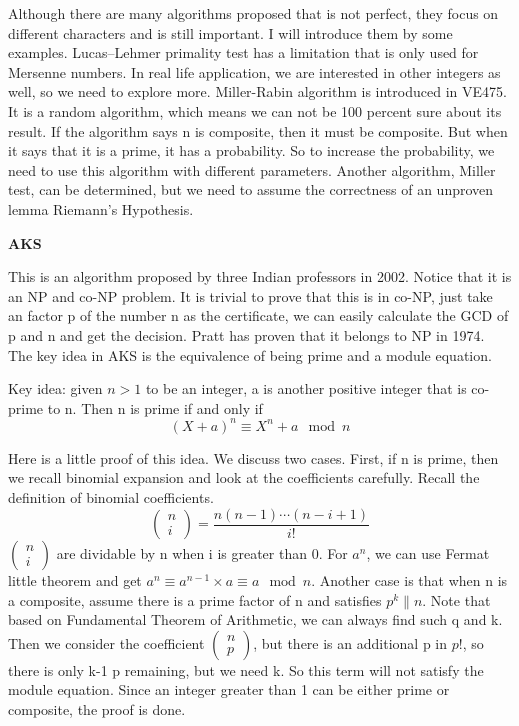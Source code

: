 \documentclass[catalog.tex]{subfiles}
\begin{document}
Although there are many algorithms proposed that is not perfect, they focus on different characters and is still important. I will introduce them by some examples. Lucas–Lehmer primality test has a limitation that is only used for Mersenne numbers\cite{bruce1993really}. In real life application, we are interested in other integers as well, so we need to explore more. Miller-Rabin algorithm is introduced in VE475. It is a random algorithm, which means we can not be 100 percent sure about its result. If the algorithm says n is composite, then it must be composite. But when it says that it is a prime, it has a probability. So to increase the probability, we need to use this algorithm with different parameters\cite{ve475}. Another algorithm, Miller test, can be determined, but we need to assume the correctness of an unproven lemma Riemann's Hypothesis\cite{miller1976riemann}. 

\textbf{AKS}

This is an algorithm proposed by three Indian professors in 2002. Notice that it is an NP and co-NP problem. It is trivial to prove that this is in co-NP, just take an factor p of the number n as the certificate, we can easily calculate the GCD of p and n and get the decision. Pratt has proven that it belongs to NP in 1974\cite{pratt1975every}. The key idea in AKS is the equivalence of being prime and a module equation\cite{agrawal2004primes}.

Key idea: given $n > 1$ to be an integer, a is another positive integer that is co-prime to n. Then n is prime if and only if $$(X+a)^n \equiv X^n + a \mod n$$

Here is a little proof of this idea. We discuss two cases. First, if n is prime, then we recall binomial expansion and look at the coefficients carefully. Recall the definition of binomial coefficients. $$\left(\begin{array}{c}n \\ i\end{array}\right)=\frac{n(n-1) \cdots(n-i+1)}{i !}$$ $\left(\begin{array}{l}n \\ i\end{array}\right)$ are dividable by n when i is greater than 0. For $a^n$, we can use Fermat little theorem and get $a^n \equiv a^{n-1} \times a \equiv a \mod n$. Another case is that when n is a composite, assume there is a prime factor of n and satisfies $p^{k} \| n$. Note that based on Fundamental Theorem of Arithmetic, we can always find such q and k. Then we consider the coefficient $\left(\begin{array}{l}n \\ p\end{array}\right)$, but there is an additional p in $p!$, so there is only k-1 p remaining, but we need k\cite{note}. So this term will not satisfy the module equation. Since an integer greater than 1 can be either prime or composite, the proof is done.
\end{document}
